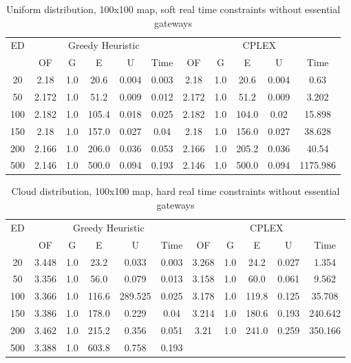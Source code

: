 \begin{table}[htb]
	\centering
	\begin{tabular}{|c|c|c|c|c|c|c|c|c|c|c|}
		\hline
		\multirow{2}{*}{ED} & \multicolumn{5}{c|}{Greedy Heuristic} & \multicolumn{5}{c|}{CPLEX}\\ 
		\cline{2-11}
& OF & G & E & U & Time & OF & G & E & U & Time\\ 
		\hline
		20 & 2.18 & 1.0 & 20.6 & 0.004 & 0.003 & 2.18 & 1.0 & 20.6 & 0.004 & 0.63 \\ 
		50 & 2.172 & 1.0 & 51.2 & 0.009 & 0.012 & 2.172 & 1.0 & 51.2 & 0.009 & 3.202 \\ 
		100 & 2.182 & 1.0 & 105.4 & 0.018 & 0.025 & 2.182 & 1.0 & 104.0 & 0.02 & 15.898 \\ 
		150 & 2.18 & 1.0 & 157.0 & 0.027 & 0.04 & 2.18 & 1.0 & 156.0 & 0.027 & 38.628 \\ 
		200 & 2.166 & 1.0 & 206.0 & 0.036 & 0.053 & 2.166 & 1.0 & 205.2 & 0.036 & 40.54 \\ 
		500 & 2.146 & 1.0 & 500.0 & 0.094 & 0.193 & 2.146 & 1.0 & 500.0 & 0.094 & 1175.986 \\ 
		\hline 
	\end{tabular} 
	\caption{Uniform distribution, 100x100 map, soft real time constraints without essential gateways} 
	\label{tab:unif_soft_n_esc_100} 
\end{table} 

\begin{table}[htb]
	\centering
	\begin{tabular}{|c|c|c|c|c|c|c|c|c|c|c|}
		\hline
		\multirow{2}{*}{ED} & \multicolumn{5}{c|}{Greedy Heuristic} & \multicolumn{5}{c|}{CPLEX}\\ 
		\cline{2-11}
& OF & G & E & U & Time & OF & G & E & U & Time\\ 
		\hline
		20 & 3.448 & 1.0 & 23.2 & 0.033 & 0.003 & 3.268 & 1.0 & 24.2 & 0.027 & 1.354 \\ 
		50 & 3.356 & 1.0 & 56.0 & 0.079 & 0.013 & 3.158 & 1.0 & 60.0 & 0.061 & 9.562 \\ 
		100 & 3.366 & 1.0 & 116.6 & 289.525 & 0.025 & 3.178 & 1.0 & 119.8 & 0.125 & 35.708 \\ 
		150 & 3.386 & 1.0 & 178.0 & 0.229 & 0.04 & 3.214 & 1.0 & 180.6 & 0.193 & 240.642 \\ 
		200 & 3.462 & 1.0 & 215.2 & 0.356 & 0.051 & 3.21 & 1.0 & 241.0 & 0.259 & 350.166 \\ 
		500 & 3.388 & 1.0 & 603.8 & 0.758 & 0.193 & & & & &  \\ 
		\hline 
	\end{tabular} 
	\caption{Cloud distribution, 100x100 map, hard real time constraints without essential gateways} 
	\label{tab:cloud_hard_n_esc_100} 
\end{table} 

